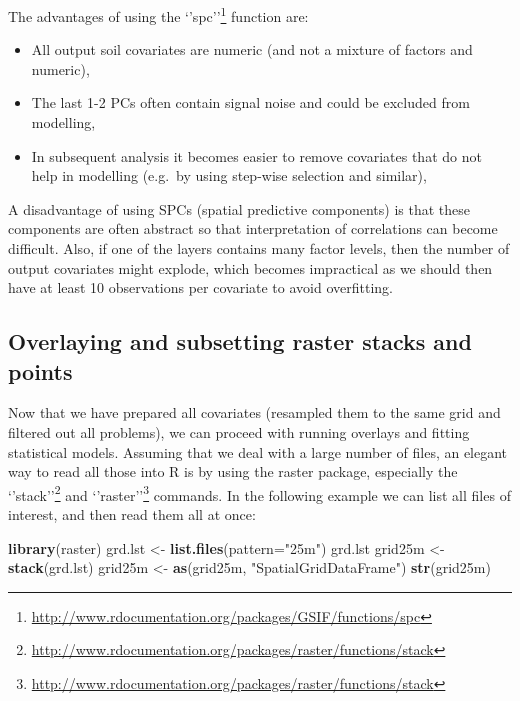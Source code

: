 \documentclass[graybox,natbib,nospthms,UStrade]{svmono}
\newenvironment{Shaded}{\begin{snugshade}}{\end{snugshade}}
\newcommand{\DataTypeTok}[1]{\textcolor[rgb]{0.27,0.27,0.27}{#1}}
\newcommand{\KeywordTok}[1]{\textcolor[rgb]{0.27,0.27,0.27}{\textbf{#1}}}
\newcommand{\NormalTok}[1]{#1}
\newcommand{\StringTok}[1]{\textcolor[rgb]{0.5,0.5,0.5}{#1}}
\renewcommand{\href}[2]{#2 (\url{#1})}
\renewcommand{\href}[2]{#2\footnote{\url{#1}}}
\begin{document}
The advantages of using the \href{http://www.rdocumentation.org/packages/GSIF/functions/spc}{`'spc''} function are:

\begin{itemize}
\item
  All output soil covariates are numeric (and not a mixture of factors and numeric),
\item
  The last 1-2 PCs often contain signal noise and could be excluded from modelling,
\item
  In subsequent analysis it becomes easier to remove covariates that do not help in modelling (e.g.~by using step-wise selection and similar),
\end{itemize}

A disadvantage of using SPCs (spatial predictive components) is that these components are often abstract so that interpretation of correlations can become difficult. Also, if one of the layers contains many factor levels, then the number of output covariates might explode, which becomes impractical as we should then have at least 10 observations per covariate to avoid overfitting.

\hypertarget{overlaying-and-subsetting-raster-stacks-and-points}{%
\subsection{Overlaying and subsetting raster stacks and points}\label{overlaying-and-subsetting-raster-stacks-and-points}}

Now that we have prepared all covariates (resampled them to the same grid and filtered out all problems), we can proceed with running overlays and fitting statistical models. Assuming that we deal with a large number of files, an elegant way to read all those into R is by using the raster package, especially the \href{http://www.rdocumentation.org/packages/raster/functions/stack}{`'stack''} and \href{http://www.rdocumentation.org/packages/raster/functions/stack}{`'raster''} commands. In the following example we can list all files of interest, and then read them all at once:

\begin{Shaded}
\begin{Highlighting}[]
\KeywordTok{library}\NormalTok{(raster)}
\NormalTok{grd.lst <-}\StringTok{ }\KeywordTok{list.files}\NormalTok{(}\DataTypeTok{pattern=}\StringTok{"25m"}\NormalTok{)}
\NormalTok{grd.lst}
\NormalTok{grid25m <-}\StringTok{ }\KeywordTok{stack}\NormalTok{(grd.lst)}
\NormalTok{grid25m <-}\StringTok{ }\KeywordTok{as}\NormalTok{(grid25m, }\StringTok{"SpatialGridDataFrame"}\NormalTok{)}
\KeywordTok{str}\NormalTok{(grid25m)}
\end{Highlighting}
\end{Shaded}
\end{document}

